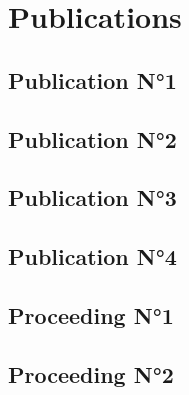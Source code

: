 \part{Publications}

\cleardoublepage \chapter{Publication N°1} \label{pap:EMMA}
\cleardoublepage  

\cleardoublepage \chapter{Publication N°2} \label{pap:feedback}
\cleardoublepage  

\cleardoublepage \chapter{Publication N°3}\label{pap:c}
\cleardoublepage  

\cleardoublepage \chapter{Publication N°4} \label{pap:z0}
\cleardoublepage  

\cleardoublepage \chapter{Proceeding N°1 } \label{pap:feedback_proceeding}
\cleardoublepage 

\cleardoublepage \chapter{Proceeding N°2} \label{pap:visu}
\cleardoublepage  
